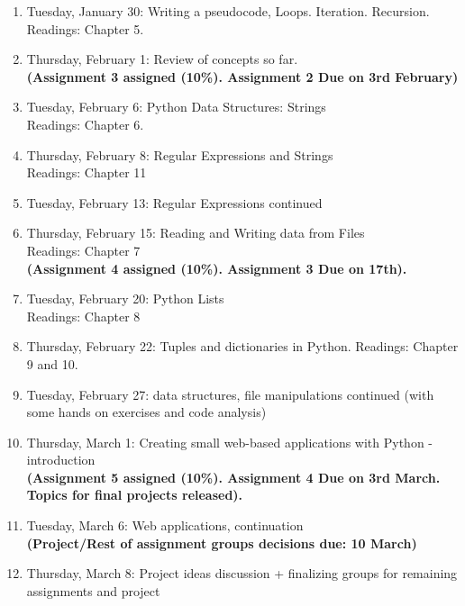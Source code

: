 \documentclass[11pt,a4paper]{article}
\begin{document}
\begin{enumerate}
  \item Tuesday, January 30: Writing a pseudocode, Loops. Iteration. Recursion.
  \\ Readings: Chapter 5. 

  \item Thursday, February 1: Review of concepts so far.
  \\ \textbf{ (Assignment 3 assigned (10\%). Assignment 2 Due on 3rd February)}

  \item Tuesday, February 6:  Python Data Structures: Strings \\ Readings: Chapter 6.

  \item Thursday, February 8: Regular Expressions and Strings \\ Readings: Chapter 11
  
   \item Tuesday, February 13: Regular Expressions continued
   
   \item Thursday, February 15:  Reading and Writing data from Files \\ Readings: Chapter 7
   \\ \textbf{ (Assignment 4 assigned (10\%). Assignment 3 Due on 17th). }

  \item Tuesday, February 20:  Python Lists \\ Readings: Chapter 8

  \item Thursday, February 22: Tuples and dictionaries in Python. Readings: Chapter 9 and 10.
  
   \item Tuesday, February 27: data structures, file manipulations continued (with some hands on exercises and code analysis)
   
    \item Thursday, March 1: Creating small web-based applications with Python - introduction
     \\ \textbf{ (Assignment 5 assigned (10\%). Assignment 4 Due on 3rd March. Topics for final projects released).}
 
  \item Tuesday, March 6: Web applications, continuation 
  \\\textbf{ (Project/Rest of assignment groups decisions due: 10 March) }

  \item Thursday, March 8: Project ideas discussion + finalizing groups for remaining assignments and project 
  

\end{enumerate}
\end{document}
